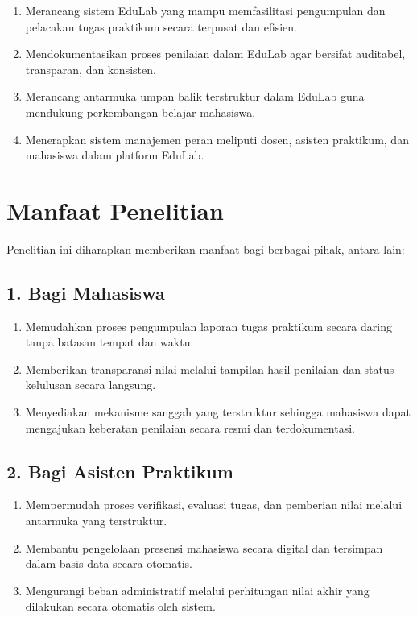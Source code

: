 \documentclass[12pt,a4paper,twoside]{report}
\begin{document}
\begin{enumerate}
    \item Merancang sistem EduLab yang mampu memfasilitasi pengumpulan dan pelacakan tugas praktikum secara terpusat dan efisien.
    \item Mendokumentasikan proses penilaian dalam EduLab agar bersifat auditabel, transparan, dan konsisten.
    \item Merancang antarmuka umpan balik terstruktur dalam EduLab guna mendukung perkembangan belajar mahasiswa.
    \item Menerapkan sistem manajemen peran meliputi dosen, asisten praktikum, dan mahasiswa dalam platform EduLab.
\end{enumerate}


\section{Manfaat Penelitian}

Penelitian ini diharapkan memberikan manfaat bagi berbagai pihak, antara lain:

\subsection*{1. Bagi Mahasiswa}
\begin{enumerate}[label=\alph*.]
    \item Memudahkan proses pengumpulan laporan tugas praktikum secara daring tanpa batasan tempat dan waktu.
    \item Memberikan transparansi nilai melalui tampilan hasil penilaian dan status kelulusan secara langsung.
    \item Menyediakan mekanisme sanggah yang terstruktur sehingga mahasiswa dapat mengajukan keberatan penilaian secara resmi dan terdokumentasi.
\end{enumerate}

\subsection*{2. Bagi Asisten Praktikum}
\begin{enumerate}[label=\alph*.]
    \item Mempermudah proses verifikasi, evaluasi tugas, dan pemberian nilai melalui antarmuka yang terstruktur.
    \item Membantu pengelolaan presensi mahasiswa secara digital dan tersimpan dalam basis data secara otomatis.
    \item Mengurangi beban administratif melalui perhitungan nilai akhir yang dilakukan secara otomatis oleh sistem.
\end{enumerate}
\end{document}
